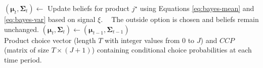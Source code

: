 \documentclass[11pt]{article}
\begin{document}
\begin{algorithm}[!htpb]
\begin{onehalfspace}
\begin{algorithmic}[1]
        \State $\left( \boldsymbol{\mu}_t, \boldsymbol{\Sigma}_{t} \right) \gets $ Update beliefs for product $j^\star$ using Equations \ref{eq:bayes-mean} and \ref{eq:bayes-var} based on signal $\xi$.
    \Else $\;\;$ The outside option is chosen and beliefs remain unchanged.
        \State $\left( \boldsymbol{\mu}_t, \boldsymbol{\Sigma}_{t} \right) \gets \left( \boldsymbol{\mu}_{t-1}, \boldsymbol{\Sigma}_{t-1} \right)$
    \EndIf
    \EndFor \\
	\Return Product choice vector (length $T$ with integer values from $0$ to $J$) and $CCP$ (matrix of size $T \times (J + 1)$) containing conditional choice probabilities at each time period.
    \EndFunction 
	\end{algorithmic}
    \end{onehalfspace}
	\vspace{0.5em} 
\end{algorithm}
\vfill
\end{document}
